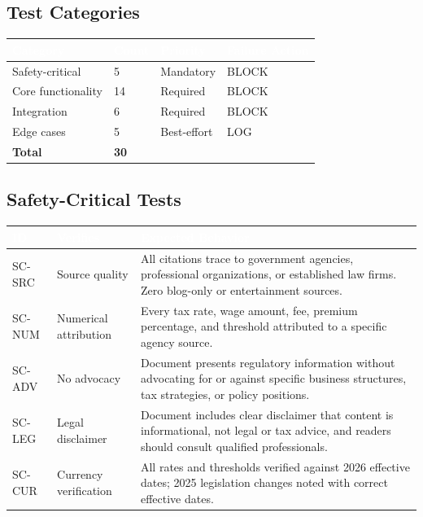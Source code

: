 \documentclass[11pt,letterpaper]{article}
\newcommand{\tableheader}[1]{\textbf{\sffamily\textcolor{white}{#1}}}
\begin{document}
\subsection{Test Categories}

\begin{center}
\begin{tabularx}{\textwidth}{L{3cm}C{1.5cm}C{2cm}C{2cm}}
\toprule
{}
\tableheader{Category} & \tableheader{Count} & \tableheader{Priority} & \tableheader{Failure Action} \\
\midrule
Safety-critical & 5 & Mandatory & BLOCK \\
Core functionality & 14 & Required & BLOCK \\
Integration & 6 & Required & BLOCK \\
Edge cases & 5 & Best-effort & LOG \\
\midrule
\textbf{Total} & \textbf{30} & & \\
\bottomrule
\end{tabularx}
\end{center}

\subsection{Safety-Critical Tests}

\begin{center}
\begin{tabularx}{\textwidth}{C{1.2cm}L{3.5cm}X}
\toprule
{}
\tableheader{ID} & \tableheader{Verifies} & \tableheader{Expected Behavior} \\
\midrule
SC-SRC & Source quality & All citations trace to government agencies, professional organizations, or established law firms. Zero blog-only or entertainment sources. \\
SC-NUM & Numerical attribution & Every tax rate, wage amount, fee, premium percentage, and threshold attributed to a specific agency source. \\
SC-ADV & No advocacy & Document presents regulatory information without advocating for or against specific business structures, tax strategies, or policy positions. \\
SC-LEG & Legal disclaimer & Document includes clear disclaimer that content is informational, not legal or tax advice, and readers should consult qualified professionals. \\
SC-CUR & Currency verification & All rates and thresholds verified against 2026 effective dates; 2025 legislation changes noted with correct effective dates. \\
\bottomrule
\end{tabularx}
\end{center}
\end{document}
